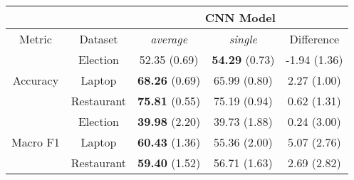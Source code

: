 \begin{tabular}{|c|c|c|c|c|}
\hline
&  &       \multicolumn{3}{c|}{CNN Model} \\
\hline
Metric & Dataset &       \textit{average} &        \textit{single} & Difference \\
\hline
\multirow{3}{*}{Accuracy} & Election &  52.35 (0.69) &  \textbf{54.29} (0.73) & -1.94 (1.36) \\
& Laptop &  \textbf{68.26} (0.69) &  65.99 (0.80) & 2.27 (1.00) \\
& Restaurant &  \textbf{75.81} (0.55) &  75.19 (0.94) & 0.62 (1.31) \\
\hline
\multirow{3}{*}{Macro F1} & Election &  \textbf{39.98} (2.20) &  39.73 (1.88) & 0.24 (3.00) \\
& Laptop &  \textbf{60.43} (1.36) &  55.36 (2.00) & 5.07 (2.76) \\
& Restaurant &  \textbf{59.40} (1.52) &  56.71 (1.63) & 2.69 (2.82) \\
\hline
\end{tabular}